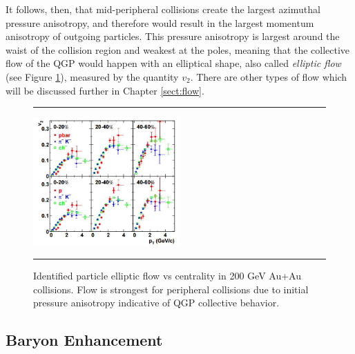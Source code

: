 It follows, then, that mid-peripheral collisions create the largest azimuthal pressure anisotropy, and therefore would result in the largest momentum anisotropy of outgoing particles. This pressure anisotropy is largest around the waist of the collision region and weakest at the poles, meaning that the collective flow of the QGP would happen with an elliptical shape, also called \textit{elliptic flow} (see Figure \ref{fig:v2auau}), measured by the quantity $v_2$. There are other types of flow which will be discussed further in Chapter \ref{sect:flow}.
    
\begin{figure}[htbp]
\centering 	\rule{35em}{0.5pt}
    \includegraphics[width=0.5\textwidth]{prevplots/v2auau.jpg}

	\caption[Identified particle elliptic flow vs centrality in 200 GeV Au+Au collisions]{Identified particle elliptic flow vs centrality in 200 GeV Au+Au collisions. Flow is strongest for peripheral collisions due to initial pressure anisotropy indicative of QGP collective behavior. \citep{Adler:2003kt}}
\label{fig:v2auau}	\rule{35em}{0.5pt}
\end{figure}

\subsection{Baryon Enhancement}

